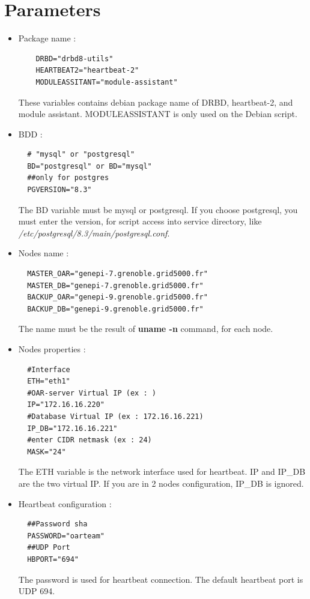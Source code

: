 \documentclass[a4paper,10pt]{report}
\begin{document}
\section{Parameters}

\begin{itemize}
 \item Package name :\\
    \begin{lstlisting}
    DRBD="drbd8-utils"
    HEARTBEAT2="heartbeat-2"
    MODULEASSITANT="module-assistant"
    \end{lstlisting}
  These variables contains debian package name of DRBD, heartbeat-2, and module assistant. MODULEASSISTANT is only used on the Debian script.

 \item BDD :\\
  \begin{lstlisting}
  # "mysql" or "postgresql"
  BD="postgresql" or BD="mysql"
  ##only for postgres
  PGVERSION="8.3"
  \end{lstlisting}
The BD variable must be mysql or postgresql. If you choose postgresql, you must enter the version, for script access into service directory, like \textit{/etc/postgresql/8.3/main/postgresql.conf}.

 \item Nodes name :\\
  \begin{lstlisting}
  MASTER_OAR="genepi-7.grenoble.grid5000.fr"
  MASTER_DB="genepi-7.grenoble.grid5000.fr"
  BACKUP_OAR="genepi-9.grenoble.grid5000.fr"
  BACKUP_DB="genepi-9.grenoble.grid5000.fr"
  \end{lstlisting}
The name must be the result of \textbf{uname -n} command, for each node.

  \item Nodes properties :\\
  \begin{lstlisting}
  #Interface
  ETH="eth1"
  #OAR-server Virtual IP (ex : )
  IP="172.16.16.220"
  #Database Virtual IP (ex : 172.16.16.221)
  IP_DB="172.16.16.221"
  #enter CIDR netmask (ex : 24)
  MASK="24"
  \end{lstlisting}
The ETH variable is the network interface used for heartbeat. IP and IP\_DB are the two virtual IP. If you are in 2 nodes configuration, IP\_DB is ignored.

  \item Heartbeat configuration :\\
  \begin{lstlisting}
  ##Password sha
  PASSWORD="oarteam"
  ##UDP Port
  HBPORT="694"
  \end{lstlisting}
The password is used for heartbeat connection. The default heartbeat port is UDP 694.


\end{itemize}
\end{document}
